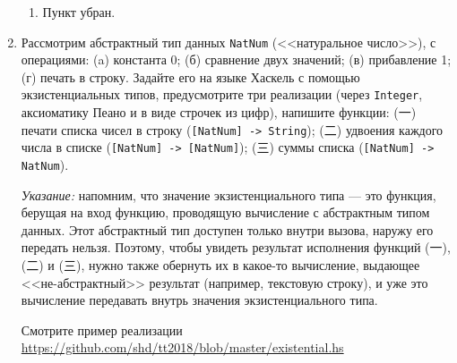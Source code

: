 \documentclass[10pt,a4paper,oneside]{article}
\begin{document}
\begin{CJK}{UTF8}{min}
\begin{enumerate}
\begin{enumerate}
\item Пункт убран.

\end{enumerate}

\item Рассмотрим абстрактный тип данных \verb!NatNum! (<<натуральное число>>), с операциями: (a) константа 0;
(б) сравнение двух значений; (в) прибавление 1; (г) печать в строку. Задайте его на языке Хаскель
с помощью экзистенциальных типов, предусмотрите три реализации (через \verb!Integer!, аксиоматику
Пеано и в виде строчек из цифр), напишите функции: (一) печати списка чисел в строку
(\verb![NatNum] -> String!); (二) удвоения каждого числа в списке (\verb![NatNum] -> [NatNum]!);
(三) суммы списка (\verb![NatNum] -> NatNum!).

\emph{Указание:} напомним, что значение экзистенциального типа --- это функция, берущая на вход
функцию, проводящую вычисление с абстрактным типом данных. Этот абстрактный тип доступен только
внутри вызова, наружу его передать нельзя. 
Поэтому, чтобы увидеть результат исполнения функций (一), (二) и (三), нужно также обернуть 
их в какое-то вычисление, выдающее 
<<не-абстрактный>> результат (например, текстовую строку), и уже это вычисление передавать
внутрь значения экзистенциального типа.

Смотрите пример реализации \url{https://github.com/shd/tt2018/blob/master/existential.hs}

\end{enumerate}
\end{CJK}
\end{document}
